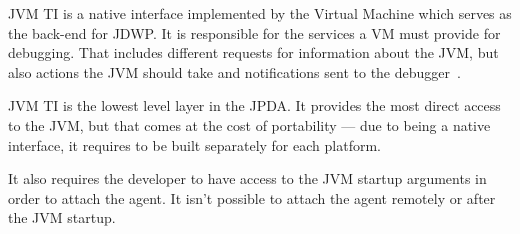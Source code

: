 \documentclass[..thesis.tex]{subfiles}
\begin{document}
JVM TI is a native interface implemented by the Virtual Machine which serves as the back-end for JDWP.
It is responsible for the services a VM must provide for debugging.
That includes different requests for information about the JVM, but also actions the JVM should take and notifications sent to the debugger~\cite{oracle_jpda_jvmti}.

JVM TI is the lowest level layer in the JPDA. 
It provides the most direct access to the JVM, but that comes at the cost of portability --- due to being a native interface, it requires to be built separately for each platform.

It also requires the developer to have access to the JVM startup arguments in order to attach the agent. It isn't possible to attach the agent remotely or after the JVM startup.
\end{document}
